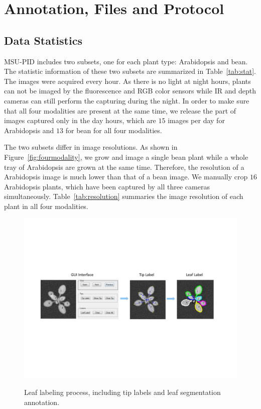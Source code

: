 \section{Annotation, Files and Protocol}
\subsection{Data Statistics}
MSU-PID includes two subsets, one for each plant type: Arabidopsis and bean.
The statistic information of these two subsets are summarized in Table~\ref{tab:stat}.
The images were acquired every hour.
As there is no light at night hours, plants can not be imaged by the fluorescence and RGB color sensors while IR and depth cameras can still perform the capturing during the night.
In order to make sure that all four modalities are present at the same time, we release the part of images captured only in the day hours, which are $15$ images per day for Arabidopsis and $13$ for bean for all four modalities.

The two subsets differ in image resolutions.
As shown in Figure~\ref{fig:fourmodality}, we grow and image a single bean plant while a whole tray of Arabidopsis are grown at the same time.
Therefore, the resolution of a Arabidopsis image is much lower than that of a bean image.
We manually crop $16$ Arabidopsis plants, which have been captured by all three cameras simultaneously.
Table~\ref{tab:resolution} summaries the image resolution of each plant in all four modalities.


\begin{figure}
\centering
\includegraphics[width=.90\textwidth]{Figures/labeling}\\
\caption{Leaf labeling process, including tip labels and leaf segmentation annotation.}
\label{fig:label}
\end{figure}

